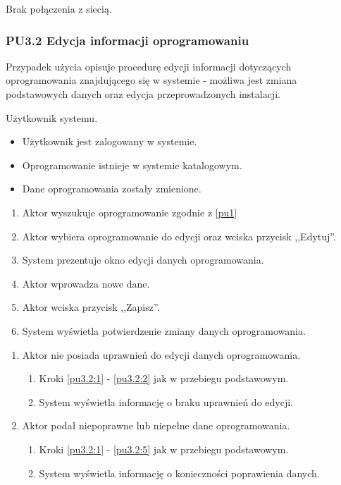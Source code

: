 Brak połączenia z siecią.

\subsubsection{PU3.2 Edycja informacji oprogramowaniu}

Przypadek użycia opisuje procedurę edycji informacji dotyczących oprogramowania znajdującego się w systemie - możliwa jest zmiana podstawowych danych oraz edycja przeprowadzonych instalacji.

Użytkownik systemu.

\begin{itemize}
\item Użytkownik jest zalogowany w systemie.
\item Oprogramowanie istnieje w systemie katalogowym.
\end{itemize}

\begin{itemize}
\item Dane oprogramowania zostały zmienione.
\end{itemize}

\begin{enumerate}
\item \label{pu3.2:1} Aktor wyszukuje oprogramowanie zgodnie z \ref{pu1}
\item \label{pu3.2:2} Aktor wybiera oprogramowanie do edycji oraz wciska przycisk ,,Edytuj''.
\item System prezentuje okno edycji danych oprogramowania.
\item Aktor wprowadza nowe dane.
\item \label{pu3.2:5} Aktor wciska przycisk ,,Zapisz''.
\item System wyświetla potwierdzenie zmiany danych oprogramowania.
\end{enumerate}

\begin{enumerate}
\item Aktor nie posiada uprawnień do edycji danych oprogramowania.
	\begin{enumerate}[label*=\arabic*.]
		\item Kroki \ref{pu3.2:1} - \ref{pu3.2:2} jak w przebiegu podstawowym.
		\item System wyświetla informację o braku uprawnień do edycji.
	\end{enumerate}
\item Aktor podał niepoprawne lub niepełne dane oprogramowania.
	\begin{enumerate}[label*=\arabic*.]
		\item Kroki \ref{pu3.2:1} - \ref{pu3.2:5} jak w przebiegu podstawowym.
		\item System wyświetla informację o konieczności poprawienia danych.
	\end{enumerate}
\end{enumerate}


